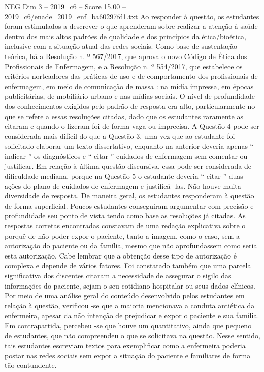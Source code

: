 \begin{textsample}{NEG Dim 3 – 2019\_c6 – Score 15.00 – 2019\_c6/enade\_2019\_enf\_ba60297fd1.txt}
Ao responder à questão, os estudantes foram estimulados a descrever o que aprenderam sobre realizar a atenção à saúde dentro dos mais altos padrões de qualidade e dos princípios da ética/bioética, inclusive com a situação atual das redes sociais.
Como base de sustentação teórica, há a Resolução n. º 567/2017, que aprova o novo Código de Ética dos Profissionais de Enfermagem, e a Resolução n. º 554/2017, que estabelece os critérios norteadores das práticas de uso e de comportamento dos profissionais de enfermagem, em meio de comunicação de massa : na mídia impressa, em épocas publicitárias, de mobiliário urbano e nas mídias sociais.
O nível de profundidade dos conhecimentos exigidos pelo padrão de resposta era alto, particularmente no que se refere a essas resoluções citadas, dado que os estudantes raramente as citaram e quando o fizeram foi de forma vaga ou imprecisa.
A Questão 4 pode ser considerada mais difícil do que a Questão 3, uma vez que ao estudante foi solicitado elaborar um texto dissertativo, enquanto na anterior deveria apenas “ indicar ” os diagnósticos e “ citar ” cuidados de enfermagem sem comentar ou justificar.
Em relação à última questão discursiva, essa pode ser considerada de dificuldade mediana, porque na Questão 5 o estudante deveria “ citar ” duas ações do plano de cuidados de enfermagem e justificá -las.
Não houve muita diversidade de resposta.
De maneira geral, os estudantes responderam à questão de forma superficial.
Poucos estudantes conseguiram argumentar com precisão e profundidade seu ponto de vista tendo como base as resoluções já citadas.
As respostas corretas encontradas constavam de uma redação explicativa sobre o porquê de não poder expor o paciente, tanto a imagem, como o caso, sem a autorização do paciente ou da família, mesmo que não aprofundassem como seria esta autorização.
Cabe lembrar que a obtenção desse tipo de autorização é complexa e depende de vários fatores.
Foi constatado também que uma parcela significativa dos discentes citaram a necessidade de assegurar o sigilo das informações do paciente, sejam o seu cotidiano hospitalar ou seus dados clínicos.
Por meio de uma análise geral do conteúdo desenvolvido pelos estudantes em relação à questão, verificou -se que a maioria mencionava a conduta antiética da enfermeira, apesar da não intenção de prejudicar e expor o paciente e sua família.
Em contrapartida, percebeu -se que houve um quantitativo, ainda que pequeno de estudantes, que não compreendeu o que se solicitava na questão.
Nesse sentido, tais estudantes escreviam textos para exemplificar como a enfermeira poderia postar nas redes sociais sem expor a situação do paciente e familiares de forma tão contundente.

\end{textsample}
